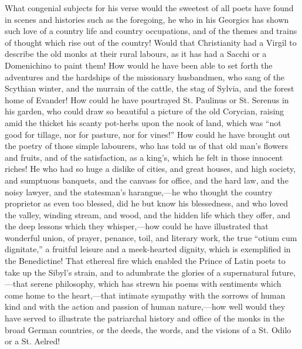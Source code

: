 What congenial subjects for his verse would the sweetest of all
poets have found in scenes and histories such as the foregoing, he who
in his Georgics has shown such love of a country life and country
occupations, and of the themes and trains of thought which rise out of
the country! Would that Christianity had a Virgil to describe the old
monks at their rural labours, as it has had a Sacchi or a Domenichino
to paint them! How would he have been able to set forth the adventures
and the hardships of the missionary husbandmen, who sang of the
Scythian winter, and the murrain of the cattle, the stag of Sylvia,
and the forest home of Evander! How could he have pourtrayed St.
Paulinus or St. Serenus in his garden, who could draw so beautiful a
picture of the old Corycian, raising amid the thicket his scanty
pot-herbs upon the nook of land, which was ``not good for tillage,
nor for pasture, nor for vines!'' How could he have brought out
the poetry of those simple labourers, who has told us of that old man's
flowers and fruits, and of the satisfaction, as a king's, which he
felt in those innocent riches! He who had so huge a dislike of cities,
and great houses, and high society, and sumptuous banquets, and the
canvass for office, and the hard law, and the noisy lawyer, and the
statesman's harangue,—he who thought the country proprietor as even
too blessed, did he but know his blessedness, and who loved the
valley, winding stream, and wood, and the hidden life which they
offer, and the deep lessons which they whisper,—how could he have
illustrated that wonderful union, of prayer, penance, toil, and
literary work, the true ``otium cum dignitate,'' a fruitful
leisure and a meek-hearted dignity, which is exemplified in the
Benedictine! That ethereal fire which enabled the Prince of Latin
poets to take up the Sibyl's strain, and to adumbrate the glories of a
supernatural future,—that serene philosophy, which has strewn his
poems with sentiments which come home to the heart,—that intimate
sympathy with the sorrows of human kind and with the action and
passion of human nature,—how well would they have served to
illustrate the patriarchal history and office of the monks in the
broad German countries, or the deeds, the words, and the visions of a
St. Odilo or a St. Aelred!

